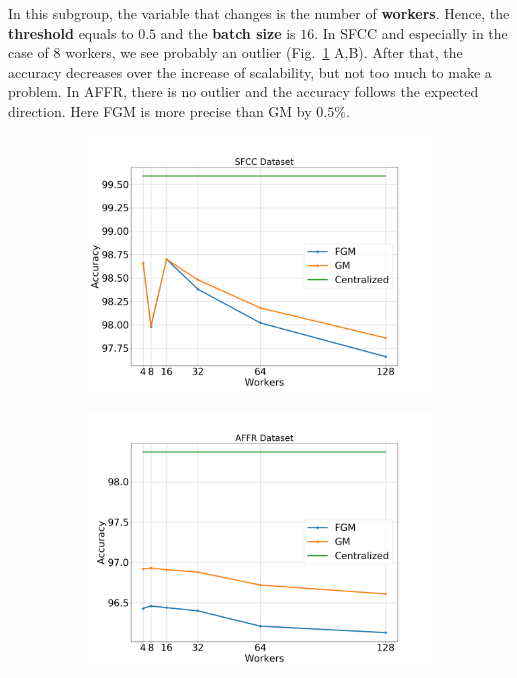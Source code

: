 In this subgroup, the variable that changes is the number of \textbf{workers}.
Hence, the \textbf{threshold} equals to $0.5$ and the \textbf{batch size} is $16$.
In SFCC and especially in the case of $8$ workers, we see probably an outlier (Fig.~\ref{fig:sfcc-affr_3_1} A,B).
After that, the accuracy decreases over the increase of scalability, but not too much to make a problem.
In AFFR, there is no outlier and the accuracy follows the expected direction.
Here FGM is more precise than GM by $0.5\%$.

\begin{figure}[H]
    \centering
    \begin{subfigure}[b]{0.45\textwidth}
        \centering
        \includegraphics[width=\textwidth]{./images/results/sfc-plots/exp_Fig_3_1.png}
        \caption{}
    \end{subfigure}
    \hfill
    \begin{subfigure}[b]{0.45\textwidth}
        \centering
        \includegraphics[width=\textwidth]{./images/results/amazon-plots/exp_Fig_3_1.png}
        \caption{}
    \end{subfigure}
    \caption{}\label{fig:sfcc-affr_3_1}
\end{figure}

